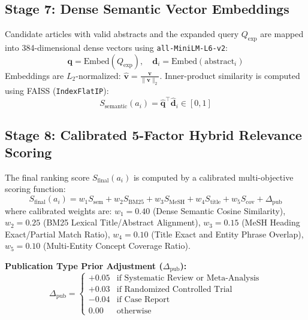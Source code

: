 \documentclass[conference]{IEEEtran}
\begin{document}
\subsection{Stage 7: Dense Semantic Vector Embeddings}
Candidate articles with valid abstracts and the expanded query $Q_{\text{exp}}$ are mapped into 384-dimensional dense vectors using \texttt{all-MiniLM-L6-v2}:
\begin{equation}
\mathbf{q} = \text{Embed}(Q_{\text{exp}}), \quad \mathbf{d}_i = \text{Embed}(\text{abstract}_i)
\end{equation}
Embeddings are $L_2$-normalized: $\hat{\mathbf{v}} = \frac{\mathbf{v}}{\|\mathbf{v}\|_2}$. Inner-product similarity is computed using FAISS (\texttt{IndexFlatIP}):
\begin{equation}
S_{\text{semantic}}(a_i) = \hat{\mathbf{q}}^\top \hat{\mathbf{d}}_i \in [0, 1]
\end{equation}

\subsection{Stage 8: Calibrated 5-Factor Hybrid Relevance Scoring}
The final ranking score $S_{\text{final}}(a_i)$ is computed by a calibrated multi-objective scoring function:
\begin{equation}
S_{\text{final}}(a_i) = w_1 S_{\text{sem}} + w_2 S_{\text{BM25}} + w_3 S_{\text{MeSH}} + w_4 S_{\text{title}} + w_5 S_{\text{cov}} + \Delta_{\text{pub}}
\end{equation}
where calibrated weights are: $w_1 = 0.40$ (Dense Semantic Cosine Similarity), $w_2 = 0.25$ (BM25 Lexical Title/Abstract Alignment), $w_3 = 0.15$ (MeSH Heading Exact/Partial Match Ratio), $w_4 = 0.10$ (Title Exact and Entity Phrase Overlap), $w_5 = 0.10$ (Multi-Entity Concept Coverage Ratio).

\textbf{Publication Type Prior Adjustment ($\Delta_{\text{pub}}$):}
\begin{equation}
\Delta_{\text{pub}} = \begin{cases} 
+0.05 & \text{if Systematic Review or Meta-Analysis} \\ 
+0.03 & \text{if Randomized Controlled Trial} \\ 
-0.04 & \text{if Case Report} \\ 
0.00 & \text{otherwise} 
\end{cases}
\end{equation}
\end{document}
